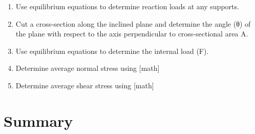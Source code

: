 \documentclass[
  letterpaper,
  DIV=11,
  numbers=noendperiod]{scrreprt}
\begin{document}
\begin{tcolorbox}[enhanced jigsaw, colbacktitle=quarto-callout-note-color!10!white, title={Step-by-step:}, coltitle=black, leftrule=.75mm, rightrule=.15mm, opacityback=0, breakable, colframe=quarto-callout-note-color-frame, left=2mm, arc=.35mm, colback=white, bottomrule=.15mm, bottomtitle=1mm, toptitle=1mm, titlerule=0mm, opacitybacktitle=0.6, toprule=.15mm]

\begin{enumerate}
\def\labelenumi{\arabic{enumi}.}
\item
  Use equilibrium equations to determine reaction loads at any supports.
\item
  Cut a cross-section along the inclined plane and determine the angle
  (θ) of the plane with respect to the axis perpendicular to
  cross-sectional area A.
\item
  Use equilibrium equations to determine the internal load (F).
\item
  Determine average normal stress using {[}math{]}
\item
  Determine average shear stress using {[}math{]}
\end{enumerate}

\end{tcolorbox}

\section{Summary}\label{summary-1}
\end{document}
